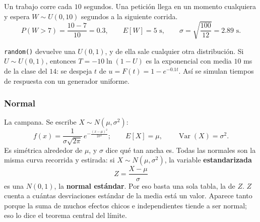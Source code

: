 \documentclass[11pt,letterpaper]{article}
\begin{document}
\begin{ejemplo}
    Un trabajo corre cada $10$ segundos. Una petición llega en un
    momento cualquiera y espera $W \sim U(0, 10)$ segundos a la
    siguiente corrida.
    \[
        P(W > 7) = \frac{10 - 7}{10} = 0.3 , \qquad
        E[W] = 5 \text{ s} , \qquad
        \sigma = \sqrt{\frac{100}{12}} = 2.89 \text{ s} .
    \]
    \begin{center}
    \end{center}
\end{ejemplo}

\begin{idea}
    \texttt{random()} devuelve una $U(0, 1)$, y de ella sale cualquier
    otra distribución. Si $U \sim U(0, 1)$, entonces
    $T = -10 \ln(1 - U)$ es la exponencial con media $10$ ms de la
    clase del $14$: se despeja $t$ de $u = F(t) = 1 - e^{-0.1 t}$. Así
    se simulan tiempos de respuesta con un generador uniforme.
\end{idea}

\subsubsection*{Normal}

La campana. Se escribe $X \sim N(\mu, \sigma^2)$:
\[
    f(x) = \frac{1}{\sigma \sqrt{2\pi}}\,
           e^{-\frac{(x - \mu)^2}{2\sigma^2}} ;
    \qquad E[X] = \mu , \qquad \operatorname{Var}(X) = \sigma^2 .
\]
Es simétrica alrededor de $\mu$, y $\sigma$ dice qué tan ancha es.
Todas las normales son la misma curva recorrida y estirada: si
$X \sim N(\mu, \sigma^2)$, la variable \textbf{estandarizada}
\[
    Z = \frac{X - \mu}{\sigma}
\]
es una $N(0, 1)$, la \textbf{normal estándar}. Por eso basta una sola
tabla, la de $Z$. $Z$ cuenta a cuántas desviaciones estándar de la
media está un valor. Aparece tanto porque la suma de muchos efectos
chicos e independientes tiende a ser normal; eso lo dice el teorema
central del límite.
\end{document}
